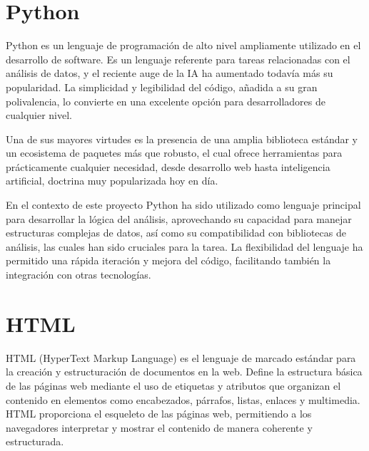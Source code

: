 \documentclass[a4paper, 12pt]{book}
\begin{document}


\section{Python}
Python es un lenguaje de programación de alto nivel ampliamente utilizado en el desarrollo de software. Es un lenguaje referente para tareas relacionadas con el análisis de datos, y el reciente auge de la IA ha aumentado todavía más su popularidad. La simplicidad y legibilidad del código, añadida a su gran polivalencia, lo convierte en una excelente opción para desarrolladores de cualquier nivel.

Una de sus mayores virtudes es la presencia de una amplia biblioteca estándar y un ecosistema de paquetes más que robusto, el cual ofrece herramientas para prácticamente cualquier necesidad, desde desarrollo web hasta inteligencia artificial, doctrina muy popularizada hoy en día.

En el contexto de este proyecto Python ha sido utilizado como lenguaje principal para desarrollar la lógica del análisis, aprovechando su capacidad para manejar estructuras complejas de datos, así como su compatibilidad con bibliotecas de análisis, las cuales han sido cruciales para la tarea. La flexibilidad del lenguaje ha permitido una rápida iteración y mejora del código, facilitando también la integración con otras tecnologías.

\section{HTML}
HTML (HyperText Markup Language) \cite{duckett_html_css} es el lenguaje de marcado estándar para la creación y estructuración de documentos en la web. Define la estructura básica de las páginas web mediante el uso de etiquetas y atributos que organizan el contenido en elementos como encabezados, párrafos, listas, enlaces y multimedia. HTML proporciona el esqueleto de las páginas web, permitiendo a los navegadores interpretar y mostrar el contenido de manera coherente y estructurada.
\end{document}
